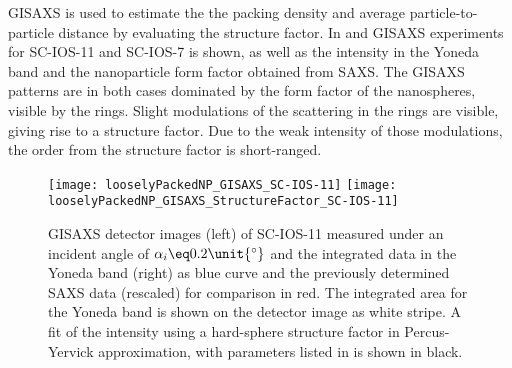 \documentclass[\main/dresen_thesis.tex]{subfiles}
\begin{document}
  \label{sec:looselyPackedNS:layers:gisaxs}
  GISAXS is used to estimate the the packing density and average particle-to-particle distance by evaluating the structure factor.
  In  and  GISAXS experiments for SC-IOS-11 and SC-IOS-7 is shown, as well as the intensity in the Yoneda band and the nanoparticle form factor obtained from SAXS.
  The GISAXS patterns are in both cases dominated by the form factor of the nanospheres, visible by the rings.
  Slight modulations of the scattering in the rings are visible, giving rise to a structure factor.
  Due to the weak intensity of those modulations, the order from the structure factor is short-ranged.
  \begin{figure}[tb]
    \centering
    \texttt{[image: looselyPackedNP\_GISAXS\_SC-IOS-11]}
    \texttt{[image: looselyPackedNP\_GISAXS\_StructureFactor\_SC-IOS-11]}
    \caption{\label{fig:looselyPackedNP:layer:gisaxsSC_IOS_11}GISAXS detector images (left) of SC-IOS-11 measured under an incident angle of $\alpha_i \eq 0.2 \unit{^\circ}$ and the integrated data in the Yoneda band (right) as blue curve and the previously determined SAXS data (rescaled) for comparison in red. The integrated area for the Yoneda band is shown on the detector image as white stripe. A fit of the intensity using a hard-sphere structure factor in Percus-Yervick approximation, with parameters listed in  is shown in black.}
  \end{figure}
\end{document}

